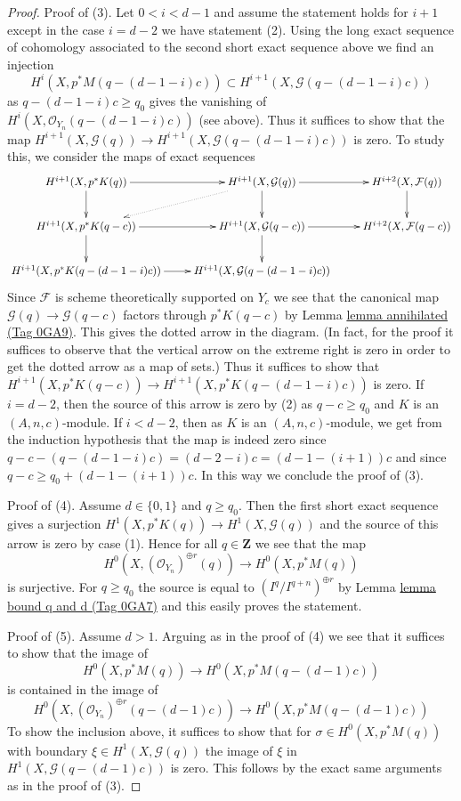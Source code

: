 \documentclass{amsart}
\theoremstyle{plain}
\theoremstyle{definition}
\theoremstyle{remark}
\numberwithin{equation}{subsection}
\begin{document}
\begin{proof}
\medskip\noindent
Proof of (3). Let $0 < i < d - 1$ and assume the statement holds for $i + 1$
except in the case $i = d - 2$ we have statement (2).
Using the long exact sequence of cohomology associated to the second
short exact sequence above we find an injection
$$
H^i(X, p^*M(q - (d - 1 - i)c)) \subset
H^{i + 1}(X, \mathcal{G}(q - (d - 1 - i)c))
$$
as $q - (d - 1 - i)c \geq q_0$ gives the vanishing of
$H^i(X, \mathcal{O}_{Y_n}(q - (d - 1 - i)c))$
(see above). Thus it suffices to show that the map
$H^{i + 1}(X, \mathcal{G}(q)) \to H^{i + 1}(X, \mathcal{G}(q - (d - 1 - i)c))$
is zero. To study this, we consider the maps of exact sequences
$$
\xymatrix{
H^{i + 1}(X, p^*K(q)) \ar[r] \ar[d] &
H^{i + 1}(X, \mathcal{G}(q)) \ar[r] \ar[d] \ar@{..>}[ld] &
H^{i + 2}(X, \mathcal{F}(q)) \ar[d] \\
H^{i + 1}(X, p^*K(q - c)) \ar[r] \ar[d] &
H^{i + 1}(X, \mathcal{G}(q - c)) \ar[r] \ar[d] &
H^{i + 2}(X, \mathcal{F}(q - c)) \\
H^{i + 1}(X, p^*K(q - (d - 1 - i)c)) \ar[r] &
H^{i + 1}(X, \mathcal{G}(q - (d - 1 - i)c))
}
$$
Since $\mathcal{F}$ is scheme theoretically supported on $Y_c$
we see that the canonical map
$\mathcal{G}(q) \to \mathcal{G}(q - c)$ factors through
$p^*K(q - c)$ by Lemma \href{https://stacks.math.columbia.edu/tag/0GA9}{lemma annihilated (Tag 0GA9)}.
This gives the dotted arrow in the diagram. (In fact, for the proof it
suffices to observe that the vertical arrow on the extreme right is
zero in order to get the dotted arrow as a map of sets.)
Thus it suffices to show that
$H^{i + 1}(X, p^*K(q - c)) \to
H^{i + 1}(X, p^*K(q - (d - 1 - i)c))$
is zero. If $i = d - 2$, then the source of this arrow
is zero by (2) as $q - c \geq q_0$ and $K$ is an $(A, n, c)$-module.
If $i < d - 2$, then as $K$ is an $(A, n, c)$-module, we get from the
induction hypothesis that the map is indeed zero
since $q - c - (q - (d - 1 - i)c) = (d - 2 - i)c = (d - 1 - (i + 1))c$
and since $q - c \geq q_0 + (d - 1 - (i + 1))c$.
In this way we conclude the proof of (3).

\medskip\noindent
Proof of (4). Assume $d \in \{0, 1\}$ and $q \geq q_0$.
Then the first short exact sequence gives a surjection
$H^1(X, p^*K(q)) \to H^1(X, \mathcal{G}(q))$
and the source of this arrow is zero by case (1). Hence
for all $q \in \mathbf{Z}$ we see that the map
$$
H^0(X, (\mathcal{O}_{Y_n})^{\oplus r}(q))
\longrightarrow
H^0(X, p^*M(q))
$$
is surjective. For $q \geq q_0$ the
source is equal to $(I^q/I^{q + n})^{\oplus r}$ by
Lemma \href{https://stacks.math.columbia.edu/tag/0GA7}{lemma bound q and d (Tag 0GA7)} and this easily proves the statement.

\medskip\noindent
Proof of (5). Assume $d > 1$. Arguing as in the proof of (4) we see that
it suffices to show that the image of
$$
H^0(X, p^*M(q))
\longrightarrow
H^0(X, p^*M(q - (d - 1)c))
$$
is contained in the image of
$$
H^0(X, (\mathcal{O}_{Y_n})^{\oplus r}(q - (d - 1)c))
\longrightarrow
H^0(X, p^*M(q - (d - 1)c))
$$
To show the inclusion above, it suffices to show that for
$\sigma \in H^0(X, p^*M(q))$ with boundary
$\xi \in H^1(X, \mathcal{G}(q))$ the image of $\xi$ in
$H^1(X, \mathcal{G}(q - (d - 1)c))$ is zero. This follows by the
exact same arguments as in the proof of (3).
\end{proof}
\end{document}
